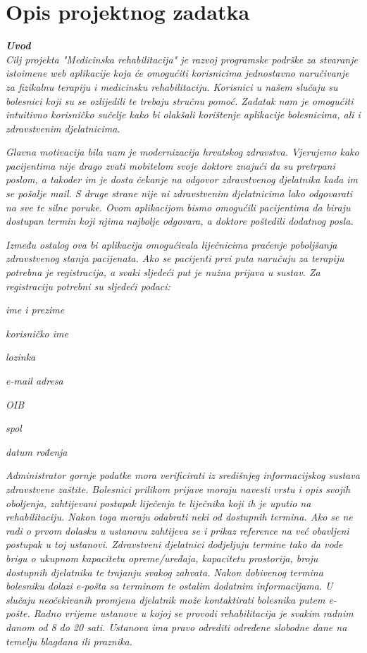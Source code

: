 \chapter{Opis projektnog zadatka}
		
		\textbf{\textit{Uvod}}\\
		
		\textit{Cilj projekta "Medicinska rehabilitacija" je razvoj programske podrške za stvaranje istoimene web aplikacije koja će omogućiti korisnicima jednostavno naručivanje za fizikalnu terapiju i medicinsku rehabilitaciju. Korisnici u našem slučaju su bolesnici koji su se ozlijedili te trebaju stručnu pomoć. Zadatak nam je omogućiti intuitivno korisničko sučelje kako bi olakšali korištenje aplikacije bolesnicima, ali i zdravstvenim djelatnicima.}
		
		\textit{Glavna motivacija bila nam je modernizacija hrvatskog zdravstva. Vjerujemo kako pacijentima nije drago zvati mobitelom svoje doktore znajući da su pretrpani poslom, a također im je dosta čekanje na odgovor zdravstvenog djelatnika kada im se pošalje mail. S druge strane nije ni zdravstvenim djelatnicima lako odgovarati na sve te silne poruke. Ovom aplikacijom bismo omogućili pacijentima da biraju dostupan termin koji njima najbolje odgovara, a doktore poštedili dodatnog posla.}
		
		\textit{Između ostalog ova bi aplikacija omogućivala liječnicima praćenje poboljšanja zdravstvenog stanja pacijenata. Ako se pacijenti prvi puta naručuju za terapiju potrebna je registracija, a svaki sljedeći put je nužna prijava u sustav. Za registraciju potrebni su sljedeći podaci: }
		\begin{packed_item}
			\item \textit{ime i prezime}
			\item \textit{korisničko ime}
			\item \textit{lozinka}
			\item \textit{e-mail adresa}
			\item \textit{OIB}
			\item \textit{spol}
			\item \textit{datum rođenja}
		\end{packed_item}
		
		\textit{Administrator gornje podatke mora verificirati iz središnjeg informacijskog sustava zdravstvene zaštite. Bolesnici prilikom prijave moraju navesti vrstu i opis svojih oboljenja, zahtijevani postupak liječenja te liječnika koji ih je uputio na rehabilitaciju. Nakon toga moraju odabrati neki od dostupnih termina. Ako se ne radi o prvom dolasku u ustanovu zahtijeva se i prikaz reference na već obavljeni postupak u toj ustanovi. Zdravstveni djelatnici dodjeljuju termine tako da vode brigu o ukupnom kapacitetu opreme/uređaja, kapacitetu prostorija, broju dostupnih djelatnika te trajanju svakog zahvata. Nakon dobivenog termina bolesniku dolazi e-pošta sa terminom te ostalim dodatnim informacijama. U slučaju neočekivanih promjena djelatnik može kontaktirati bolesnika putem e-pošte. Radno vrijeme ustanove u kojoj se provodi rehabilitacija je svakim radnim danom od 8 do 20 sati. Ustanova ima pravo odrediti određene slobodne dane na temelju blagdana ili praznika.}\\
		
